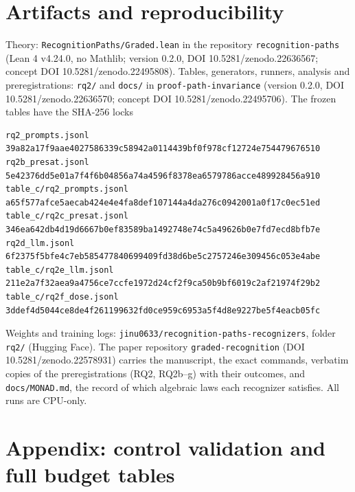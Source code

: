\section{Artifacts and reproducibility}\label{artifacts-and-reproducibility}

Theory: \texttt{RecognitionPaths/Graded.lean} in the repository \texttt{recognition-paths} (Lean 4 v4.24.0, no Mathlib; version 0.2.0, DOI 10.5281/zenodo.22636567; concept DOI 10.5281/zenodo.22495808). Tables, generators, runners, analysis and preregistrations: \texttt{rq2/} and \texttt{docs/} in \texttt{proof-path-invariance} (version 0.2.0, DOI 10.5281/zenodo.22636570; concept DOI 10.5281/zenodo.22495706). The frozen tables have the SHA-256 locks

\begin{verbatim}
rq2_prompts.jsonl            39a82a17f9aae4027586339c58942a0114439bf0f978cf12724e754479676510
rq2b_presat.jsonl            5e42376dd5e01a7f4f6b04856a74a4596f8378ea6579786acce489928456a910
table_c/rq2_prompts.jsonl    a65f577afce5aecab424e4e4fa8def107144a4da276c0942001a0f17c0ec51ed
table_c/rq2c_presat.jsonl    346ea642db4d19d6667b0ef83589ba1492748e74c5a49626b0e7fd7ecd8bfb7e
rq2d_llm.jsonl               6f2375f5bfe4c7eb585477840699409fd38d6be5c2757246e309456c053e4abe
table_c/rq2e_llm.jsonl       211e2a7f32aea9a4756ce7ccfe1972d24cf2f9ca50b9bf6019c2af21974f29b2
table_c/rq2f_dose.jsonl      3ddef4d5044ce8de4f261199632fd0ce959c6953a5f4d8e9227be5f4eacb05fc
\end{verbatim}

Weights and training logs: \texttt{jinu0633/recognition-paths-recognizers}, folder \texttt{rq2/} (Hugging Face). The paper repository \texttt{graded-recognition} (DOI 10.5281/zenodo.22578931) carries the manuscript, the exact commands, verbatim copies of the preregistrations (RQ2, RQ2b--g) with their outcomes, and \texttt{docs/MONAD.md}, the record of which algebraic laws each recognizer satisfies. All runs are CPU-only.

\section*{Appendix: control validation and full budget tables}\label{appendix-control-validation-and-full-budget-tables}

